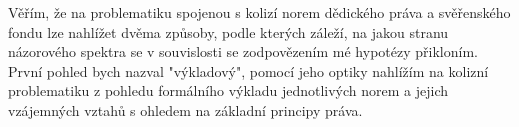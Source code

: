 \documentclass{article}
\begin{document}


Věřím, že na problematiku spojenou s kolizí norem dědického práva a svěřenského fondu lze nahlížet dvěma způsoby, podle kterých záleží, na jakou stranu názorového spektra se v souvislosti se zodpovězením mé hypotézy přikloním.\\

První pohled bych nazval "výkladový", pomocí jeho optiky nahlížím na kolizní problematiku z pohledu formálního výkladu jednotlivých norem a jejich vzájemných vztahů s ohledem na základní principy práva.\\

\end{document}
